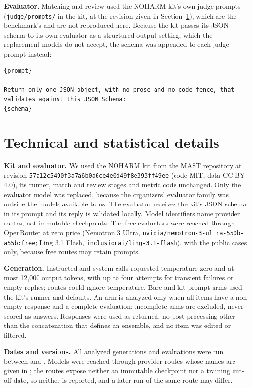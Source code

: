 \documentclass[11pt]{article}
\newcommand{\mainsec}[1]{\emph{\nameref{#1}}}
\begin{document}
\textbf{Evaluator.} Matching and review used the NOHARM kit's own judge prompts
(\nolinkurl{judge/prompts/} in the kit, at the revision given in Section~\ref{app:technical}),
which are the benchmark's and are not reproduced here. Because the kit passes its JSON schema to
its own evaluator as a structured-output setting, which the replacement models do not accept, the
schema was appended to each judge prompt instead:
\begin{lstlisting}
{prompt}

Return only one JSON object, with no prose and no code fence, that validates against this JSON Schema:
{schema}
\end{lstlisting}

\section{Technical and statistical details}
\label{app:technical}
\textbf{Kit and evaluator.} We used the NOHARM kit from the MAST repository at revision
\texttt{57a12c5490f3a7a6b0a6ce4e0d49f8e393ff49ee} (code MIT, data CC BY 4.0), its runner, match and
review stages and metric code unchanged. Only the evaluator model was replaced, because the
organizers' evaluator family was outside the models available to us. The evaluator receives the
kit's JSON schema in its prompt and its reply is validated locally. Model identifiers name provider
routes, not immutable checkpoints. The free evaluators were reached through OpenRouter at zero
price (Nemotron 3 Ultra, \texttt{nvidia/nemotron-3-ultra-550b-a55b:free}; Ling 3.1 Flash,
\texttt{inclusionai/ling-3.1-flash}), with the public cases only, because free routes may retain
prompts.

\textbf{Generation.} Instructed and system calls requested temperature zero and at most 12,000
output tokens, with up to four attempts for transient failures or empty replies; routes could
ignore temperature. Bare and kit-prompt arms used the kit's runner and defaults. An arm is analyzed
only when all \nItems{} items have a non-empty response and a complete evaluation; incomplete arms
are excluded, never scored as answers. Responses were used as returned: no post-processing other than
the concatenation that defines an ensemble, and no item was edited or filtered.

\textbf{Dates and versions.} All analyzed generations and evaluations were run between
\covFirstJudged{} and \covLastJudged{}. Models were reached through provider routes whose names
are given in \mainsec{sec:models}; the routes expose neither an immutable checkpoint nor a
training cut-off date, so neither is reported, and a later run of the same route may differ.
\end{document}
